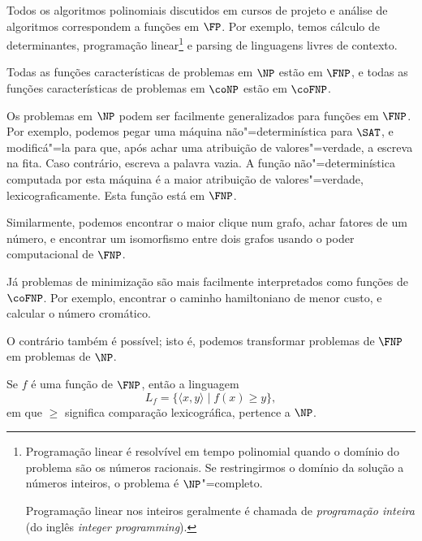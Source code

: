 \begin{example}
    Todos os algoritmos polinomiais
    discutidos em cursos de projeto e análise de algoritmos
    correspondem a funções em $\FP$.
    Por exemplo,
    temos cálculo de determinantes,
    programação linear\footnote{
        Programação linear é resolvível em tempo polinomial
        quando o domínio do problema são os números racionais.
        Se restringirmos o domínio da solução a números inteiros,
        o problema é $\NP$"=completo.

        Programação linear nos inteiros geralmente é chamada de
        \emph{programação inteira}
        (do inglês \emph{integer programming}).
    }
    e parsing de linguagens livres de contexto.
\end{example}

\begin{uproposition}
    Todas as funções características de problemas em $\NP$ estão em $\FNP$,
    e todas as funções características de problemas em $\coNP$ estão em $\coFNP$.
\end{uproposition}

\begin{example}
    Os problemas em $\NP$ podem ser facilmente generalizados para funções em $\FNP$.
    Por exemplo,
    podemos pegar uma máquina não"=determinística para $\SAT$,
    e modificá"=la para que,
    após achar uma atribuição de valores"=verdade,
    a escreva na fita.
    Caso contrário,
    escreva a palavra vazia.
    A função não"=determinística computada por esta máquina
    é a maior atribuição de valores"=verdade,
    lexicograficamente.
    Esta função está em $\FNP$.

    Similarmente,
    podemos encontrar o maior clique num grafo,
    achar fatores de um número,
    e encontrar um isomorfismo entre dois grafos
    usando o poder computacional de $\FNP$.

    Já problemas de minimização
    são mais facilmente interpretados como funções de $\coFNP$.
    Por exemplo,
    encontrar o caminho hamiltoniano de menor custo,
    e calcular o número cromático.
\end{example}

O contrário também é possível;
isto é,
podemos transformar problemas de $\FNP$ em problemas de $\NP$.

\begin{theorem}
    Se $f$ é uma função de $\FNP$,
    então a linguagem
    \begin{equation*}
        L_f = \{ \langle x, y \rangle \mid f(x) \geq y \},
    \end{equation*}
    em que $\geq$ significa comparação lexicográfica,
    pertence a $\NP$.
    \label{thm:fnp_to_np_conversion}
\end{theorem}

